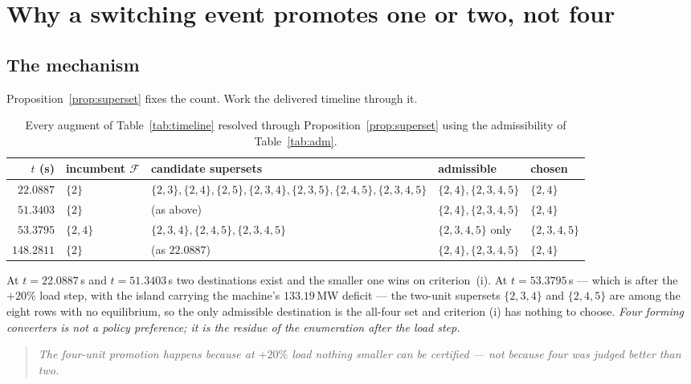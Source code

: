 \documentclass[12pt,a4paper]{article}
\theoremstyle{remark}
\begin{document}
\section{Why a switching event promotes one or two, not four}\label{sec:count}

\subsection{The mechanism}

Proposition~\ref{prop:superset} fixes the count. Work the delivered timeline
through it.

\begin{table}[H]
\centering
\small
\begin{tabular}{@{}rllll@{}}
\toprule
$t$ (s) & \textbf{incumbent $\mathcal{F}$} & \textbf{candidate supersets} & \textbf{admissible} & \textbf{chosen}\\
\midrule
$22.0887$ & $\{2\}$ & $\{2,3\},\{2,4\},\{2,5\},\{2,3,4\},\{2,3,5\},\{2,4,5\},\{2,3,4,5\}$
          & $\{2,4\},\{2,3,4,5\}$ & $\{2,4\}$\\
$51.3403$ & $\{2\}$ & (as above) & $\{2,4\},\{2,3,4,5\}$ & $\{2,4\}$\\
$53.3795$ & $\{2,4\}$ & $\{2,3,4\},\{2,4,5\},\{2,3,4,5\}$ & $\{2,3,4,5\}$ only & $\{2,3,4,5\}$\\
$148.2811$& $\{2\}$ & (as $22.0887$) & $\{2,4\},\{2,3,4,5\}$ & $\{2,4\}$\\
\bottomrule
\end{tabular}
\caption{Every augment of Table~\ref{tab:timeline} resolved through
Proposition~\ref{prop:superset} using the admissibility of Table~\ref{tab:adm}.}
\label{tab:resolution}
\end{table}

At $t = 22.0887$\,s and $t = 51.3403$\,s two destinations exist and the smaller
one wins on criterion~(i). At $t = 53.3795$\,s --- which is after the $+20\%$
load step, with the island carrying the machine's $133.19$\,MW deficit --- the
two-unit supersets $\{2,3,4\}$ and $\{2,4,5\}$ are among the eight rows with no
equilibrium, so the only admissible destination is the all-four set and criterion
(i) has nothing to choose. \emph{Four forming converters is not a policy
preference; it is the residue of the enumeration after the load step.}

\begin{quote}\small\itshape
The four-unit promotion happens because at $+20\%$ load nothing smaller can be
certified --- not because four was judged better than two.
\end{quote}
\end{document}
